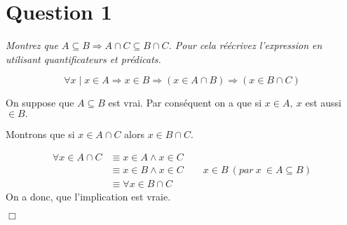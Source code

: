 \section*{Question 1}
\emph{Montrez que \( A \subseteq B \Rightarrow A \cap C \subseteq B \cap C\). Pour cela réécrivez l’expression en utilisant quantificateurs et prédicats.}


\[\forall x \mid x \in A \Rightarrow x \in B \Rightarrow (x \in A \cap B) \Rightarrow (x \in B \cap C)\]

\bigskip
On suppose que $A \subseteq B$ est vrai. Par conséquent on a que si $x \in A,\ x$ est aussi $\in B.$
	
Montrons que si $x \in A \cap C$ alors $x \in B \cap C$.

\begin{align*}
	\forall x \in A \cap C &\equiv x \in A \wedge x \in C\\
	&\equiv x \in B \wedge x \in C \qquad x \in B\ (par\ x\ \in A \subseteq B)\\
	&\equiv \forall x \in B \cap C
\end{align*}
\smallskip
On a donc, que l'implication est vraie.
\begin{flushright}
	$\Box$
\end{flushright}